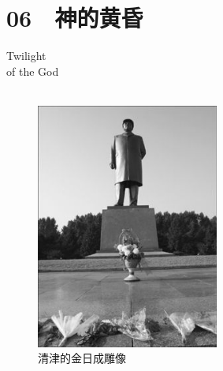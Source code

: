 \fancyhead[RO]{{\tiny{\textcolor{Gray}{\FA \ }}}\thepage}
\fancyhead[LE]{{\tiny{\textcolor{Gray}{\FA \ }}}\thepage}
\fancyfoot[LE,RO]{}
\fancyfoot[LO,CE]{}
\fancyfoot[CO,RE]{}
\chapter*{06 {\FA } 神的黄昏}
\vspace{5mm}
\begin{flushright}
	\textcolor{PinYinColor}{\EN \huge{Twilight\\
		of the God\\
	\ \\}}
\end{flushright}

\begin{figure}[!htbp]
	\centering
	\includegraphics[width=6cm]{./Chapters/Images/06.jpg}
	\caption*{清津的金日成雕像}
\end{figure}

